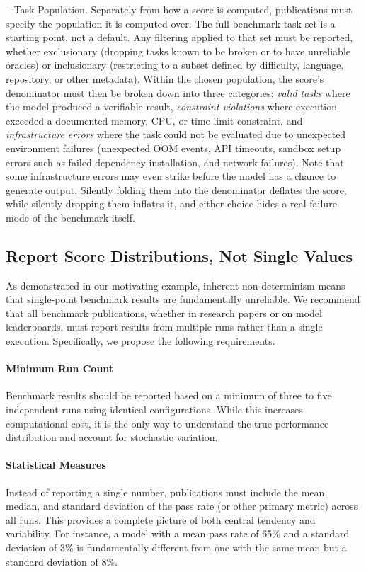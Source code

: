\documentclass{IEEEcsmag}
\begin{document}
\smallskip \noindent -- Task Population. Separately from how a score is computed, publications must specify the population it is computed over. The full benchmark task set is a starting point, not a default. Any filtering applied to that set must be reported, whether exclusionary (dropping tasks known to be broken or to have unreliable oracles) or inclusionary (restricting to a subset defined by difficulty, language, repository, or other metadata). Within the chosen population, the score's denominator must then be broken down into three categories: \textit{valid tasks} where the model produced a verifiable result, \textit{constraint violations} where execution exceeded a documented memory, CPU, or time limit constraint, and \textit{infrastructure errors} where the task could not be evaluated due to unexpected environment failures (unexpected OOM events, API timeouts, sandbox setup errors such as failed dependency installation, and network failures). Note that some infrastructure errors may even strike before the model has a chance to generate output. Silently folding them into the denominator deflates the score, while silently dropping them inflates it, and either choice hides a real failure mode of the benchmark itself.

\subsection{Report Score Distributions, Not Single Values}
\label{sec:rec-distributions}

As demonstrated in our motivating example, inherent non-determinism means that single-point benchmark results are fundamentally unreliable. We recommend that all benchmark publications, whether in research papers or on model leaderboards, must report results from multiple runs rather than a single execution. Specifically, we propose the following requirements.

\paragraph{Minimum Run Count}
Benchmark results should be reported based on a minimum of three to five independent runs using identical configurations. While this increases computational cost, it is the only way to understand the true performance distribution and account for stochastic variation.

\paragraph{Statistical Measures}
Instead of reporting a single number, publications must include the mean, median, and standard deviation of the pass rate (or other primary metric) across all runs. This provides a complete picture of both central tendency and variability. For instance, a model with a mean pass rate of 65\% and a standard deviation of 3\% is fundamentally different from one with the same mean but a standard deviation of 8\%.
\end{document}
